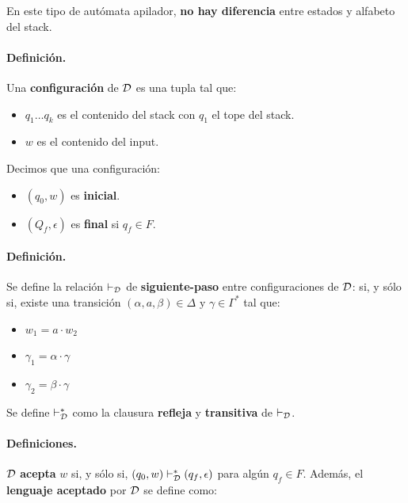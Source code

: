 En este tipo de autómata apilador, \textbf{no hay diferencia} entre estados y alfabeto del stack.

\paragraph*{Definición.} Una \textbf{configuración} de $\mathcal{D}$ es una tupla
tal que:
\begin{itemize}
    \item $q_1\ldots q_k$ es el contenido del stack con $q_1$ el tope del stack.
    \item $w$ es el contenido del input.
\end{itemize}
Decimos que una configuración:
\begin{itemize}
    \item $(q_0,w)$ es \textbf{inicial}.
    \item $(Q_f,\epsilon)$ es \textbf{final} si $q_f \in F$.
\end{itemize}

\paragraph*{Definición.} Se define la relación $\vdash_{\mathcal{D}}$ de \textbf{siguiente-paso} entre configuraciones de $\mathcal{D}$:
si, y sólo si, existe una transición $\left(\alpha, a, \beta\right) \in \Delta \text { y } \gamma \in \Gamma^*$ tal que:
\begin{itemize}
    \item $w_1 = a \cdot w_2$
    \item $\gamma_1 = \alpha\cdot \gamma$
    \item $\gamma_2 = \beta \cdot \gamma$
\end{itemize}

Se define $\vdash_{\mathcal{D}}^*$ como la clausura \textbf{refleja} y \textbf{transitiva} de $\vdash_{\mathcal{D}}$.

\paragraph*{Definiciones.} $\mathcal{D}$ \textbf{acepta} $w$ si, y sólo si, $(q_0,w) \vdash_{\mathcal{D}}^* (q_f,\epsilon)$ para algún $q_f \in F$. Además, el \textbf{lenguaje aceptado} por $\mathcal{D}$ se define como:

